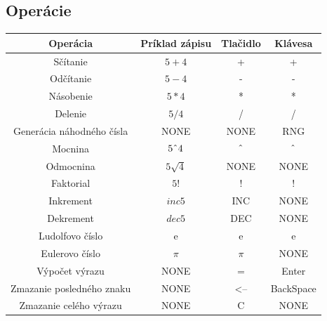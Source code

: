 \documentclass[a4paper, 11pt]{article}
\begin{document}
    \subsection{Operácie}
    \begin{center}
    \begin{tabular}{ |c|c|c|c| } 
         \hline
         \textbf{Operácia} & \textbf{Príklad zápisu} & \textbf{Tlačidlo} & \textbf{Klávesa} \\ \hline
         Sčítanie &  $5+4$ & + & + \\ \hline
         Odčítanie & $5-4$ & - & - \\ \hline
         Násobenie & $5*4$ & * & *\\ \hline
         Delenie & $5/4$ & / & / \\ \hline
         Generácia náhodného čísla & NONE & NONE & RNG\\ \hline
         Mocnina & $5{\mathchar"5E}4$ & ${\mathchar"5E}$ & ${\mathchar"5E}$\\ \hline
         Odmocnina & $5 \sqrt 4$ & NONE & NONE\\ \hline
         Faktorial & $ 5! $ & ! & !\\ \hline
         Inkrement & $inc5$ & INC & NONE \\ \hline
         Dekrement & $dec5$ & DEC & NONE\\ \hline
         Ludolfovo číslo & e & e & e\\ \hline
         Eulerovo číslo & $\pi$ & $\pi$ & NONE\\ \hline
         Výpočet výrazu & NONE & = & Enter\\ \hline
         Zmazanie posledného znaku & NONE & <-- & BackSpace\\ \hline
         Zmazanie celého výrazu & NONE & C & NONE \\ \hline
    \end{tabular}
    \end{center}
\end{document}

